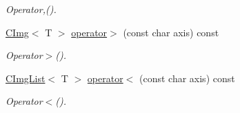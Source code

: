 \begin{DoxyCompactItemize}
\begin{DoxyCompactList}\small\item\em Operator,(). \item\end{DoxyCompactList}\item 
\hypertarget{structcimg__library_1_1CImgList_a6eed4f177047ce79eb3b30f5b713be88}{
\hyperlink{structcimg__library_1_1CImg}{CImg}$<$ T $>$ \hyperlink{structcimg__library_1_1CImgList_a6eed4f177047ce79eb3b30f5b713be88}{operator$>$} (const char axis) const }
\label{structcimg__library_1_1CImgList_a6eed4f177047ce79eb3b30f5b713be88}

\begin{DoxyCompactList}\small\item\em Operator$>$(). \item\end{DoxyCompactList}\item 
\hypertarget{structcimg__library_1_1CImgList_afe3488dac908a062ddbd0b53a11be712}{
\hyperlink{structcimg__library_1_1CImgList}{CImgList}$<$ T $>$ \hyperlink{structcimg__library_1_1CImgList_afe3488dac908a062ddbd0b53a11be712}{operator$<$} (const char axis) const }
\label{structcimg__library_1_1CImgList_afe3488dac908a062ddbd0b53a11be712}

\begin{DoxyCompactList}\small\item\em Operator$<$(). \item\end{DoxyCompactList}\end{DoxyCompactItemize}
